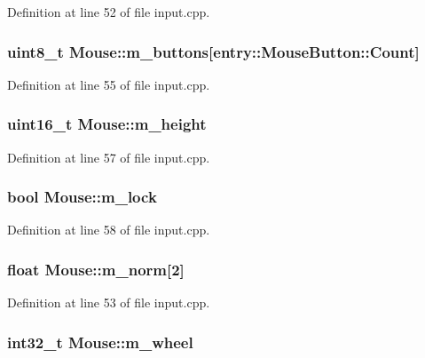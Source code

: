 Definition at line 52 of file input.\+cpp.

\hypertarget{struct_mouse_aeacb26d4b4ad5b6bb62dccaa4ea82dc1}{
\subsubsection[{m\+\_\+buttons}]{\setlength{\rightskip}{0pt plus 5cm}uint8\+\_\+t Mouse\+::m\+\_\+buttons\mbox{[}{\bf entry\+::\+Mouse\+Button\+::\+Count}\mbox{]}}}\label{struct_mouse_aeacb26d4b4ad5b6bb62dccaa4ea82dc1}


Definition at line 55 of file input.\+cpp.

\hypertarget{struct_mouse_afa714e583237c2a4a1d523ec3b2038ff}{
\subsubsection[{m\+\_\+height}]{\setlength{\rightskip}{0pt plus 5cm}uint16\+\_\+t Mouse\+::m\+\_\+height}}\label{struct_mouse_afa714e583237c2a4a1d523ec3b2038ff}


Definition at line 57 of file input.\+cpp.

\hypertarget{struct_mouse_a0c7f95542b778469fd215b224af0bce9}{
\subsubsection[{m\+\_\+lock}]{\setlength{\rightskip}{0pt plus 5cm}bool Mouse\+::m\+\_\+lock}}\label{struct_mouse_a0c7f95542b778469fd215b224af0bce9}


Definition at line 58 of file input.\+cpp.

\hypertarget{struct_mouse_a1641bb4620edd76fa00092216de31820}{
\subsubsection[{m\+\_\+norm}]{\setlength{\rightskip}{0pt plus 5cm}float Mouse\+::m\+\_\+norm\mbox{[}2\mbox{]}}}\label{struct_mouse_a1641bb4620edd76fa00092216de31820}


Definition at line 53 of file input.\+cpp.

\hypertarget{struct_mouse_a9be7ff2af5255f1fe5645496dc3b63ac}{
\subsubsection[{m\+\_\+wheel}]{\setlength{\rightskip}{0pt plus 5cm}int32\+\_\+t Mouse\+::m\+\_\+wheel}}\label{struct_mouse_a9be7ff2af5255f1fe5645496dc3b63ac}


